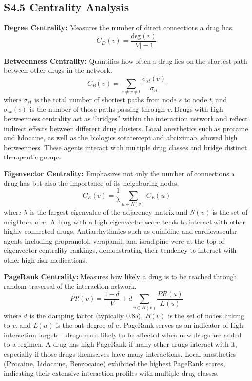 \documentclass[11pt,a4paper]{article}
\begin{document}
\subsection{S4.5 Centrality Analysis}

\textbf{Degree Centrality:} Measures the number of direct connections a drug has.
\[
C_D(v) = \frac{\text{deg}(v)}{|V| - 1}
\]

\textbf{Betweenness Centrality:} Quantifies how often a drug lies on the shortest path between other drugs in the network.
\[
C_B(v) = \sum_{s \neq v \neq t} \frac{\sigma_{st}(v)}{\sigma_{st}}
\]
where $\sigma_{st}$ is the total number of shortest paths from node $s$ to node $t$, and $\sigma_{st}(v)$ is the number of those paths passing through $v$. Drugs with high betweenness centrality act as ``bridges'' within the interaction network and reflect indirect effects between different drug clusters. Local anesthetics such as procaine and lidocaine, as well as the biologics sotatercept and abciximab, showed high betweenness. These agents interact with multiple drug classes and bridge distinct therapeutic groups.

\textbf{Eigenvector Centrality:} Emphasizes not only the number of connections a drug has but also the importance of its neighboring nodes.
\[
C_E(v) = \frac{1}{\lambda} \sum_{u \in N(v)} C_E(u)
\]
where $\lambda$ is the largest eigenvalue of the adjacency matrix and $N(v)$ is the set of neighbors of $v$. A drug with a high eigenvector score tends to interact with other highly connected drugs. Antiarrhythmics such as quinidine and cardiovascular agents including propranolol, verapamil, and isradipine were at the top of eigenvector centrality rankings, demonstrating their tendency to interact with other high-risk medications.

\textbf{PageRank Centrality:} Measures how likely a drug is to be reached through random traversal of the interaction network.
\[
PR(v) = \frac{1-d}{|V|} + d \sum_{u \in B(v)} \frac{PR(u)}{L(u)}
\]
where $d$ is the damping factor (typically 0.85), $B(v)$ is the set of nodes linking to $v$, and $L(u)$ is the out-degree of $u$. PageRank serves as an indicator of high-interaction targets---drugs most likely to be affected when new drugs are added to a regimen. A drug has high PageRank if many other drugs interact with it, especially if those drugs themselves have many interactions. Local anesthetics (Procaine, Lidocaine, Benzocaine) exhibited the highest PageRank scores, indicating their extensive interaction profiles with multiple drug classes.
\end{document}
